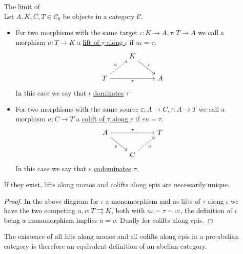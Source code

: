 \begin{definition} The limit of \\
Let $A, K, C, T \in \mathcal{C}_{0}$ be objects in a category $\mathcal{C}$.
\begin{itemize}
\item For two morphisms with the same target $\iota : K \rightarrow A, \tau : T \rightarrow A$ we call a morphism $u : T \rightarrow K$ a
\ul{lift of $\tau$ along $\iota$} if $u \iota = \tau$.
\[
\begin{tikzcd}
                                              & K \arrow[rd, "\iota"] &   \\
T \arrow[rr, "\tau"'] \arrow[ru, "u", dashed] &                       & A
\end{tikzcd}
\]
In this case we say that $\iota$ \ul{dominates} $\tau$
\item For two morphisms with the same source $\varepsilon : A \rightarrow C, \tau : A \rightarrow T$ we call a morphism
$u : C \rightarrow T$ a \ul{colift of $\tau$ along $\varepsilon$} if $\varepsilon u = \tau$.
\[
\begin{tikzcd}
A \arrow[rr, "\tau"] \arrow[rd, "\varepsilon"'] &                            & T \\
                                                & C \arrow[ru, "u"', dashed] &  
\end{tikzcd}
\]
In this case we say that $\varepsilon$ \ul{codominates} $\tau$.
\end{itemize}
\end{definition}

\begin{remark}
If they exist, lifts along monos and colifts along epis are necessarily unique.
\end{remark}
\begin{proof}
In the above diagram for $\iota$ a monomorphism and as lifts of $\tau$ along $\iota$ we have the two competing
$u, v : T \rightrightarrows K$, both with $u \iota = \tau = v \iota$, the definition of $\iota$ being a monomorphism
implies $u = v$. Dually for colifts along epis.
\end{proof}

The existence of all lifts along monos and all colifts along epis
in a pre-abelian category is therefore an equivalent definition of an abelian category.

